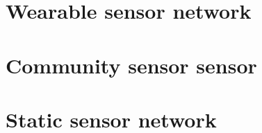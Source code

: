 \section{Wearable sensor network}

\section{Community sensor sensor}

\section{Static sensor network}